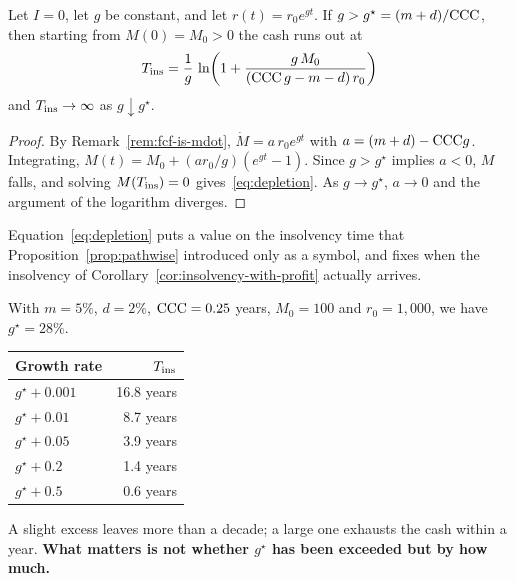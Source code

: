 \begin{proposition}
\label{prop:depletion}
Let $I=0$, let $g$ be constant, and let $r(t)=r_0e^{gt}$. If
$g>g^\star=(m+d)/\mathrm{CCC}$, then starting from $M(0)=M_0>0$ the cash runs out at
\begin{equation}
T_{\mathrm{ins}} = \frac{1}{g}\,
\ln\!\left(1+\frac{g\,M_0}{(\mathrm{CCC}\,g-m-d)\,r_0}\right)
\label{eq:depletion}
\end{equation}
and $T_{\mathrm{ins}}\to\infty$ as $g\downarrow g^\star$.
\end{proposition}

\begin{proof}
By Remark~\ref{rem:fcf-is-mdot}, $\dot M = a\,r_0e^{gt}$ with $a=(m+d)-\mathrm{CCC} g$.
Integrating, $M(t)=M_0+(a r_0/g)(e^{gt}-1)$. Since $g>g^\star$ implies $a<0$, $M$ falls, and
solving $M(T_{\mathrm{ins}})=0$ gives~\eqref{eq:depletion}. As $g\to g^\star$, $a\to 0$ and the
argument of the logarithm diverges.
\end{proof}

Equation~\eqref{eq:depletion} puts a value on the insolvency time that
Proposition~\ref{prop:pathwise} introduced only as a symbol, and fixes when the insolvency
of Corollary~\ref{cor:insolvency-with-profit} actually arrives.

\begin{example}
\label{ex:depletion}
With $m=5\%$, $d=2\%$, $\mathrm{CCC}=0.25$ years, $M_0=100$ and $r_0=1{,}000$, we have
$g^\star=28\%$.
\begin{center}
\begin{tabular}{@{}lr@{}}
\toprule
Growth rate & $T_{\mathrm{ins}}$ \\
\midrule
$g^\star+0.001$ & 16.8 years \\
$g^\star+0.01$ & 8.7 years \\
$g^\star+0.05$ & 3.9 years \\
$g^\star+0.2$ & 1.4 years \\
$g^\star+0.5$ & 0.6 years \\
\bottomrule
\end{tabular}
\label{tab:depletion}
\end{center}
A slight excess leaves more than a decade; a large one exhausts the cash within a year.
\textbf{What matters is not whether $g^\star$ has been exceeded but by how much.}
\end{example}

